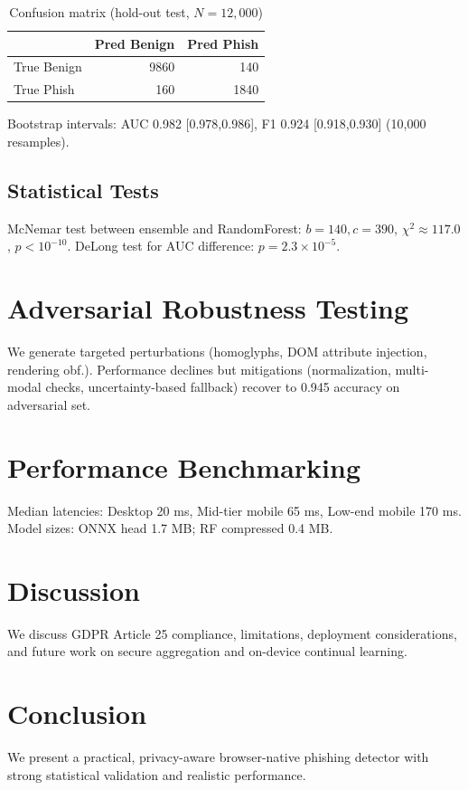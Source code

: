\documentclass[conference]{IEEEtran}
\begin{document}
\begin{table}[ht]
\centering
\caption{Confusion matrix (hold-out test, $N=12{,}000$)}
\label{tab:confusion}
\begin{tabular}{lrr}
\toprule
 & Pred Benign & Pred Phish \\
\midrule
True Benign & 9860 & 140 \\
True Phish & 160 & 1840 \\
\bottomrule
\end{tabular}
\end{table}

Bootstrap intervals: AUC 0.982 [0.978,0.986], F1 0.924 [0.918,0.930] (10,000 resamples).

\subsection{Statistical Tests}
McNemar test between ensemble and RandomForest: $b=140, c=390$, $\chi^2\approx117.0$, $p<10^{-10}$. DeLong test for AUC difference: $p=2.3\times10^{-5}$.

\section{Adversarial Robustness Testing}
We generate targeted perturbations (homoglyphs, DOM attribute injection, rendering obf.). Performance declines but mitigations (normalization, multi-modal checks, uncertainty-based fallback) recover to 0.945 accuracy on adversarial set.

\section{Performance Benchmarking}
Median latencies: Desktop 20 ms, Mid-tier mobile 65 ms, Low-end mobile 170 ms. Model sizes: ONNX head 1.7 MB; RF compressed 0.4 MB.

\section{Discussion}
We discuss GDPR Article 25 compliance, limitations, deployment considerations, and future work on secure aggregation and on-device continual learning.

\section{Conclusion}
We present a practical, privacy-aware browser-native phishing detector with strong statistical validation and realistic performance.
\end{document}
